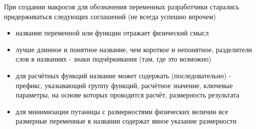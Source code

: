 При создании макросов для обозначения переменных разработчики старались придерживаться следующих соглашений (не всегда успешно впрочем)
\begin{itemize}
	\item название переменной или функции отражает физический смысл 
	\item лучше длинное и понятное название, чем короткое и непонятное, разделители слов в названиях - знаки подчёркивания (там, где это возможно)
	\item для расчётных функций название может содержать (последовательно) - префикс, указывающий группу функций, расчётное значение, ключевые параметры, на основе которых проводится расчёт, размерность результата
	\item для минимизации путаницы с размерностями физических величин все размерные переменные в названии содержат явное указание размерности
\end{itemize}


